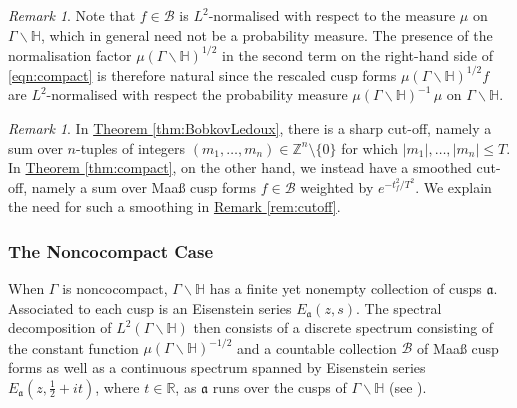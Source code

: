 \documentclass[11pt,a4paper]{amsart}
\newcommand{\af}{\mathfrak{a}}
\newcommand{\BB}{\mathcal{B}}
\newcommand{\Hb}{\mathbb{H}}
\newcommand{\R}{\mathbb{R}}
\newcommand{\Z}{\mathbb{Z}}
\numberwithin{equation}{section}
\theoremstyle{remark}
\newtheorem{remark}[equation]{Remark}
\theoremstyle{definition}
\begin{document}
\begin{remark}
Note that $f \in \BB$ is $L^2$-normalised with respect to the measure $\mu$ on $\Gamma \backslash \Hb$, which in general need not be a probability measure. The presence of the normalisation factor $\mu(\Gamma \backslash \Hb)^{1/2}$ in the second term on the right-hand side of \eqref{eqn:compact} is therefore natural since the rescaled cusp forms $\mu(\Gamma \backslash \Hb)^{1/2} f$ are $L^2$-normalised with respect the probability measure $\mu(\Gamma \backslash \Hb)^{-1} \, \mu$ on $\Gamma \backslash \Hb$.
\end{remark}

\begin{remark}
In \hyperref[thm:BobkovLedoux]{Theorem \ref*{thm:BobkovLedoux}}, there is a sharp cut-off, namely a sum over $n$-tuples of integers $(m_1,\ldots,m_n) \in \Z^n \setminus \{0\}$ for which $|m_1|,\ldots,|m_n| \leq T$. In \hyperref[thm:compact]{Theorem \ref*{thm:compact}}, on the other hand, we instead have a smoothed cut-off, namely a sum over Maa\ss{} cusp forms $f \in \BB$ weighted by $e^{-t_f^2/T^2}$. We explain the need for such a smoothing in \hyperref[rem:cutoff]{Remark \ref*{rem:cutoff}}.
\end{remark}


\subsubsection{The Noncocompact Case}
\label{sec:noncompact}

When $\Gamma$ is noncocompact, $\Gamma \backslash \Hb$ has a finite yet nonempty collection of cusps $\af$. Associated to each cusp is an Eisenstein series $E_{\af}(z,s)$. The spectral decomposition of $L^2(\Gamma \backslash \Hb)$ then consists of a discrete spectrum consisting of the constant function $\mu(\Gamma \backslash \Hb)^{-1/2}$ and a countable collection $\BB$ of Maa\ss{} cusp forms as well as a continuous spectrum spanned by Eisenstein series $E_{\af}(z,\frac{1}{2} + it)$, where $t \in \R$, as $\af$ runs over the cusps of $\Gamma \backslash \Hb$ (see \cite[Chapters 4 and 7]{Iwa02}).
\end{document}
